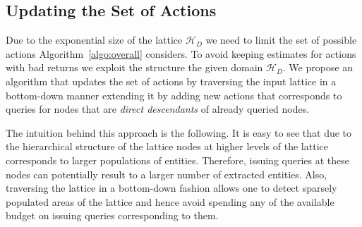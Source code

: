 \documentclass{vldb}
\newcommand{\hierarchy}{\mathcal{H}_D}
\begin{document}
\subsection{Updating the Set of Actions}
Due to the exponential size of the lattice $\hierarchy$ we need to limit the set of possible actions Algorithm~\ref{algo:overall} considers. To avoid keeping estimates for actions with bad returns we exploit the structure the given domain $\hierarchy$. We propose an algorithm that updates the set of actions by traversing the input lattice in a bottom-down manner extending it by adding new actions that corresponds to queries for nodes that are {\em direct descendants} of already queried nodes.

The intuition behind this approach is the following. It is easy to see that due to the hierarchical structure of the lattice nodes at higher levels of the lattice corresponds to larger populations of entities. Therefore, issuing queries at these nodes can potentially result to a larger number of extracted entities. Also, traversing the lattice in a bottom-down fashion allows one to detect sparsely populated areas of the lattice and hence avoid spending any of the available budget on issuing queries corresponding to them.
\end{document}

